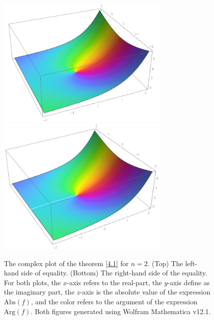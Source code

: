  \begin{figure}[t]
 	\centering
 	\includegraphics[width=0.75\textwidth]{4.1LHS.png}
 	 	\includegraphics[width=0.75\textwidth]{4.1RHS.png}
 	\caption{The complex plot of the theorem \eqref{4.1} for $n = 2$. (Top) The left-hand side of equality. (Bottom) The right-hand side of the equality. For both plots, the $x$-axis refers to the real-part, the $y$-axis define as the imaginary part, the $z$-axis is the absolute value of the expression $\mathrm{Abs}(f)$, and the color refers to the argument of the expression $\mathrm{Arg}(f)$. Both figures generated using Wolfram Mathematica v12.1.}
 	\label{F4.1}
 \end{figure}

